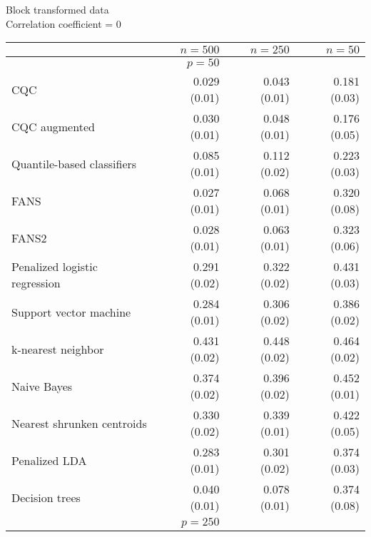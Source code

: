 \begin{table}[p]
  \centering
  Block transformed data \\
  Correlation coefficient = 0 \\[2ex]
  \begin{adjustbox}{max size={\textwidth}{10cm}}
    \begin{tabular}{l@{\extracolsep{15mm}}rrr}
      
      \hline
      & $n=500$ & $n=250$ & $n=50$ \\ 
      \hline
      & $p = 50$ \\
      \hline

      CQC & 0.029 (0.01) & 0.043 (0.01) & 0.181 (0.03) \\ 
      CQC augmented & 0.030 (0.01) & 0.048 (0.01) & 0.176 (0.05) \\ 
      Quantile-based classifiers & 0.085 (0.01) & 0.112 (0.02) & 0.223 (0.03) \\ 
      FANS  & 0.027 (0.01) & 0.068 (0.01) & 0.320 (0.08) \\
      FANS2 & 0.028 (0.01) & 0.063 (0.01) & 0.323 (0.06) \\
      Penalized logistic regression & 0.291 (0.02) & 0.322 (0.02) & 0.431 (0.03) \\ 
      Support vector machine & 0.284 (0.01) & 0.306 (0.02) & 0.386 (0.02) \\ 
      k-nearest neighbor & 0.431 (0.02) & 0.448 (0.02) & 0.464 (0.02) \\ 
      Naive Bayes & 0.374 (0.02) & 0.396 (0.02) & 0.452 (0.01) \\ 
      Nearest shrunken centroids & 0.330 (0.02) & 0.339 (0.01) & 0.422 (0.05) \\ 
      Penalized LDA & 0.283 (0.01) & 0.301 (0.02) & 0.374 (0.03) \\ 
      Decision trees & 0.040 (0.01) & 0.078 (0.01) & 0.374 (0.08) \\ [2ex]

      \hline
      & $p = 250$ \\
      \hline


\end{tabular}
\end{adjustbox}
\end{table}
